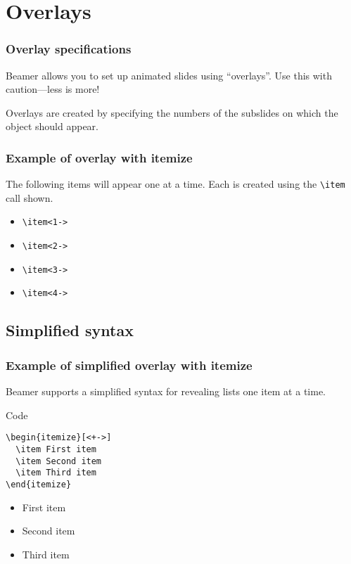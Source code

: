 \section{Overlays}
\begin{frame}
  \frametitle{Overlay specifications}
  Beamer allows you to set up animated slides using ``overlays''.
  Use this with caution---less is more!

  Overlays are created by specifying the numbers of the subslides on which the object should appear.
\end{frame}

\begin{frame}[fragile] %
  \frametitle{Example of overlay with itemize}
  The following items will appear one at a time.
  Each is created using the \verb|\item| call shown.
  \begin{itemize}
  \item<1-> \verb|\item<1->|
  \item<2-> \verb|\item<2->|
  \item<3-> \verb|\item<3->|
  \item<4-> \verb|\item<4->|
  \end{itemize}
\end{frame}

\subsection{Simplified syntax}
\begin{frame}[fragile]
  \frametitle{Example of simplified overlay with itemize}

  Beamer supports a simplified syntax for revealing lists one item at a time.
  \begin{block}{Code}
  \begin{verbatim}
\begin{itemize}[<+->]
  \item First item
  \item Second item
  \item Third item
\end{itemize}
  \end{verbatim}
  \end{block}

  \begin{itemize}[<+->]
    \item First item
    \item Second item
    \item Third item
  \end{itemize}
\end{frame}

